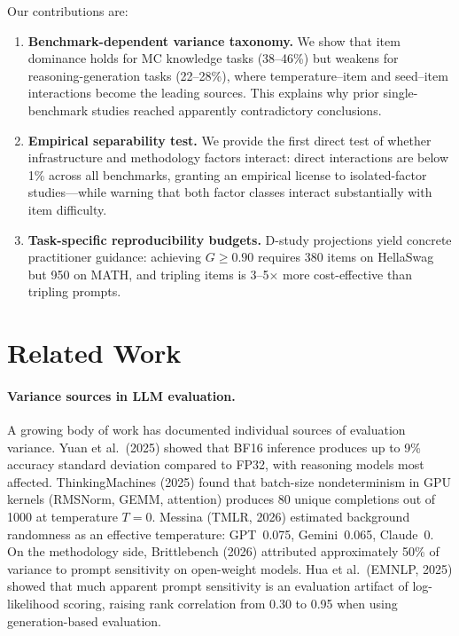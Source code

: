 \documentclass[11pt]{article}
\newcommand{\gcoeff}{G}
\begin{document}
Our contributions are:
\begin{enumerate}
    \item \textbf{Benchmark-dependent variance taxonomy.} We show that item dominance holds for MC knowledge tasks (38--46\%) but weakens for reasoning-generation tasks (22--28\%), where temperature--item and seed--item interactions become the leading sources. This explains why prior single-benchmark studies reached apparently contradictory conclusions.
    \item \textbf{Empirical separability test.} We provide the first direct test of whether infrastructure and methodology factors interact: direct interactions are below 1\% across all benchmarks, granting an empirical license to isolated-factor studies---while warning that both factor classes interact substantially with item difficulty.
    \item \textbf{Task-specific reproducibility budgets.} D-study projections yield concrete practitioner guidance: achieving $\gcoeff \geq 0.90$ requires 380 items on HellaSwag but 950 on MATH, and tripling items is 3--5$\times$ more cost-effective than tripling prompts.
\end{enumerate}

\section{Related Work}

\paragraph{Variance sources in LLM evaluation.}
A growing body of work has documented individual sources of evaluation variance.
Yuan et al.\ (2025) showed that BF16 inference produces up to 9\% accuracy standard deviation compared to FP32, with reasoning models most affected.
ThinkingMachines (2025) found that batch-size nondeterminism in GPU kernels (RMSNorm, GEMM, attention) produces 80 unique completions out of 1000 at temperature $T=0$.
Messina (TMLR, 2026) estimated background randomness as an effective temperature: GPT~0.075, Gemini~0.065, Claude~0.
On the methodology side, Brittlebench (2026) attributed approximately 50\% of variance to prompt sensitivity on open-weight models.
Hua et al.\ (EMNLP, 2025) showed that much apparent prompt sensitivity is an evaluation artifact of log-likelihood scoring, raising rank correlation from 0.30 to 0.95 when using generation-based evaluation.
\end{document}
